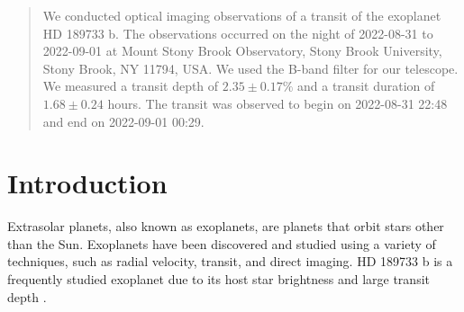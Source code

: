 \documentclass[twocolumn]{aastex631}
\begin{document}

\author{112166935}
\author{112601517}
\author{112695826}




\begin{abstract}
We conducted optical imaging observations of a transit of the exoplanet HD 189733 b. The observations occurred on the night of 2022-08-31 to 2022-09-01 at Mount Stony Brook Observatory, Stony Brook University, Stony Brook, NY 11794, USA. We used the B-band filter for our telescope. We measured a transit depth of $2.35 \pm 0.17 \%$ and a transit duration of $1.68 \pm 0.24$ hours. The transit was observed to begin on 2022-08-31 22:48 and end on 2022-09-01 00:29.
\end{abstract}


\section{Introduction} \label{sec:intro}

Extrasolar planets, also known as exoplanets, are planets that orbit stars other than the Sun. Exoplanets have been discovered and studied using a variety of techniques, such as radial velocity, transit, and direct imaging.  HD 189733 b is a frequently studied exoplanet due to its host star brightness and large transit depth \citep{Cauley_2017}. 
\end{document}
